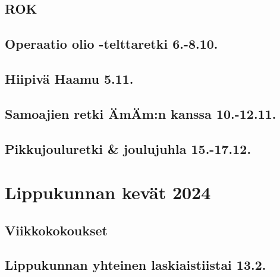 \documentclass[10pt,finnish,a5paper,headings=small,twoside=semi]{scrartcl}
\begin{document}
	\subsection{ROK}
	\subsection{Operaatio olio -telttaretki 6.-8.10.}
	\subsection{Hiipivä Haamu 5.11.}
	\subsection{Samoajien retki ÄmÄm:n kanssa 10.-12.11.}
	\subsection{Pikkujouluretki \& joulujuhla 15.-17.12.}

\clearpage\section{Lippukunnan kevät 2024}
	\subsection{Viikkokokoukset}

	\clearpage
	\subsection{Lippukunnan yhteinen laskiaistiistai 13.2.}
\end{document}

